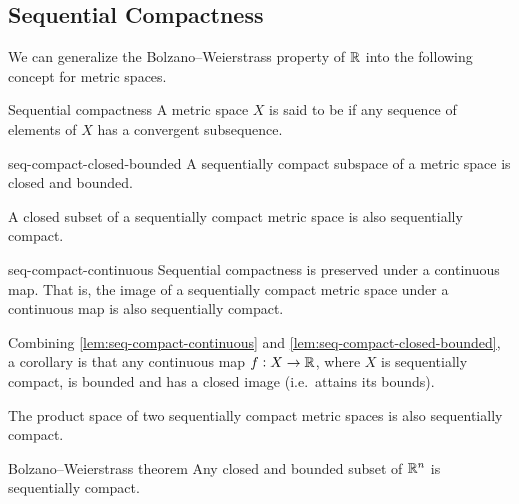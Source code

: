 \documentclass{styles/tufte}
\begin{document}
\subsection{Sequential Compactness}

  We can generalize the Bolzano--Weierstrass property of $\mathbb{R}$ into the following concept for metric spaces.
  
  \begin{definition}{Sequential compactness}{}
    A metric space $X$ is said to be  if any sequence of elements of $X$ has a convergent subsequence.
  \end{definition}
  
  \begin{lemma}{}{seq-compact-closed-bounded}
    A sequentially compact subspace of a metric space is closed and bounded.
  \end{lemma}
  
  \begin{lemma}{}{}
    A closed subset of a sequentially compact metric space is also sequentially compact.
  \end{lemma}
  
  \begin{lemma}{}{seq-compact-continuous}
    Sequential compactness is preserved under a continuous map. That is, the image of a sequentially compact metric space under a continuous map is also sequentially compact.
  \end{lemma}
  Combining \cref{lem:seq-compact-continuous} and \cref{lem:seq-compact-closed-bounded}, a corollary is that any continuous map $f: X \to \mathbb{R}$, where $X$ is sequentially compact, is bounded and has a closed image (i.e.~attains its bounds).
  
  \begin{lemma}{}{}
    The product space of two sequentially compact metric spaces is also sequentially compact.
  \end{lemma}
  
  \begin{theorem}{Bolzano--Weierstrass theorem}{}
    Any closed and bounded subset of $\mathbb{R}^n$ is sequentially compact.
  \end{theorem}
  
\end{document}
